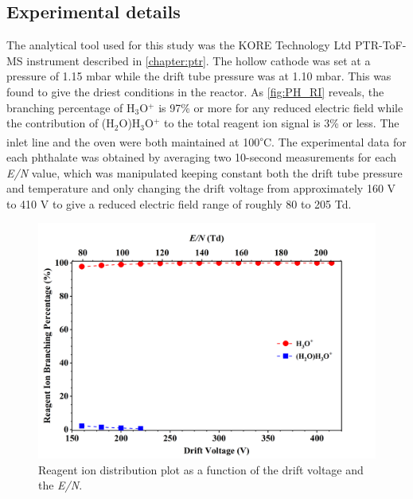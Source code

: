 
\subsection{Experimental details}

The analytical tool used for this study was the KORE Technology Ltd PTR-ToF-MS instrument described in \autoref{chapter:ptr}.
%
The hollow cathode was set at a pressure of 1.15 mbar while the drift tube pressure was at 1.10 mbar.
%
This was found to give the driest conditions in the reactor.
%
As \autoref{fig:PH_RI} reveals, the branching  percentage of H$_3$O$^+$ is   97\% or more for any reduced electric field while the contribution of  (H$_2$O)H$_3$O$^+$ to the total reagent ion signal is 3\% or less.
%
The inlet line and the oven were both maintained  at 100\textsuperscript{$\circ$}C.
%
The experimental data for each phthalate was obtained by averaging two 10-second measurements for each \textit{E/N} value, which was manipulated keeping constant both  the drift tube pressure and  temperature and only changing the drift voltage  from approximately 160 V to 410 V to give a reduced electric field range of roughly 80 to 205 Td.



        \begin{figure}[htb]%
        \centering
        \includegraphics[height=0.4\textheight]{pics/PH/RI-BR.png}
        \caption{Reagent ion distribution plot as a function of the drift voltage and the \textit{E/N}.}
        \label{fig:PH_RI}
        \end{figure}



